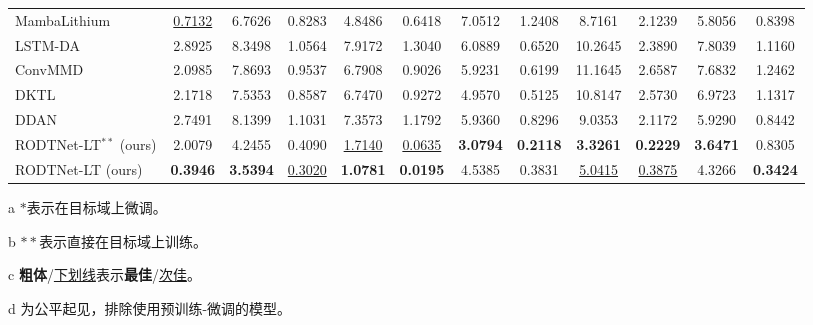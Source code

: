 \documentclass[lettersize,onecolumn]{IEEEtran}
\begin{document}
\begin{table}[htbp]
{\begin{threeparttable}
\begin{tabular}{lccccccccccc}
    MambaLithium \cite{shi2024mambalithiumselectivestatespace} & \underline{0.7132}  & 6.7626  & 0.8283  & 4.8486  & 0.6418  & 7.0512  & 1.2408  & 8.7161  & 2.1239  & 5.8056  & 0.8398  \\
    LSTM-DA \cite{HAN2022230823} & 2.8925  & 8.3498  & 1.0564  & 7.9172  & 1.3040  & 6.0889  & 0.6520  & 10.2645  & 2.3890  & 7.8039  & 1.1160  \\
    ConvMMD \cite{9788003} & 2.0985  & 7.8693  & 0.9537  & 6.7908  & 0.9026  & 5.9231  & 0.6199  & 11.1645  & 2.6587  & 7.6832  & 1.2462  \\
    DKTL \cite{10029904}  & 2.1718  & 7.5353  & 0.8587  & 6.7470  & 0.9272  & 4.9570  & 0.5125  & 10.8147  & 2.5730  & 6.9723  & 1.1317  \\
    DDAN \cite{9560040}  & 2.7491  & 8.1399  & 1.1031  & 7.3573  & 1.1792  & 5.9360  & 0.8296  & 9.0353  & 2.1172  & 5.9290  & 0.8442  \\
    RODTNet-LT$^{\ast\ast}$ {(ours)} & 2.0079  & 4.2455  & 0.4090  & \underline{1.7140}  & \underline{0.0635}  & \textbf{3.0794} & \textbf{0.2118} & \textbf{3.3261} & \textbf{0.2229} & \textbf{3.6471} & 0.8305  \\
    RODTNet-LT (ours) & \textbf{0.3946} & \textbf{3.5394} & \underline{0.3020}  & \textbf{1.0781} & \textbf{0.0195} & 4.5385  & 0.3831  & \underline{5.0415}  & \underline{0.3875}  & 4.3266  & \textbf{0.3424} \\
    \bottomrule
    \end{tabular}%
      \begin{tablenotes}
        \item[a] $\ast$表示在目标域上微调。
        \item[b] ${\ast\ast}$表示直接在目标域上训练。
        \item[c] \textbf{粗体}/\underline{下划线}表示\textbf{最佳}/\underline{次佳}。
        \item[d] 为公平起见，排除使用预训练-微调的模型。
    \end{tablenotes}
\end{threeparttable}
}
    \label{tab:soh_results}%
\end{table}%



\end{document}
